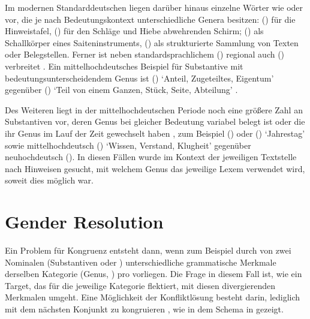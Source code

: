 Im modernen Standarddeutschen liegen darüber hinaus einzelne Wörter wie
 oder  vor, die je nach Bedeutungskontext
unterschiedliche Genera besitzen:  (\NeutI) für die
Hinweistafel,  (\MascI) für den Schläge und Hiebe abwehrenden
Schirm;  (\MascI) als Schallkörper eines Saiteninstruments,
 (\NeutI) als strukturierte Sammlung von Texten oder
Belegstellen. Ferner ist neben standardsprachlichem  (\FemI)
regional auch  (\MascI) verbreitet
\autocite[s.\,v.~\textit{der/die Butter}]{elspassmoeller2003}. Ein
mittelhochdeutsches Beispiel für Substantive mit
bedeutungs\-unterscheidendem Genus ist  (\MascI) `Anteil,
Zugeteiltes, Eigentum' gegenüber  (\NeutI) `Teil von einem
Ganzen, Stück, Seite, Abteilung' \autocite[s.\,v.~\textit{teil}]{lexer:mhdhwb}.

Des Weiteren liegt in der mittelhochdeutschen Periode
noch eine größere Zahl an Substantiven vor, deren Genus bei gleicher Bedeutung
variabel belegt ist oder die ihr Genus im Lauf der Zeit gewechselt haben
\autocite[157--166]{ksw2}, zum Beispiel  (\FemI) oder  (\NeutI) `Jahrestag' sowie mittel\-hoch\-deutsch
 (\FemI) `Wissen, Verstand, Klugheit'
\autocite[vgl.][s.\,v.~\textit{witze}]{lexer:mhdhwb} gegenüber
neu\-hoch\-deutsch  (\MascI). In diesen Fällen
wurde im Kontext der jeweiligen Text\-stelle nach Hinweisen gesucht, mit
welchem Genus das jeweilige Lexem verwendet wird, soweit dies möglich war.


\section{Gender Resolution}
\label{sec:gendres}

Ein Problem für Kongruenz entsteht dann, wenn zum Beispiel durch
 von zwei Nominalen (Substantiven oder
) unterschiedliche grammatische
Merkmale derselben Kategorie (Genus,
) pro  vorliegen. Die Frage in diesem Fall ist,
wie ein Target, das für die jeweilige Kategorie flektiert, mit diesen
divergierenden Merkmalen umgeht. Eine Möglichkeit der Konfliktlösung besteht
darin, lediglich mit dem nächsten Konjunkt zu kongruieren
\autocites[;
vgl.][179--180]{corbett1983}[168--170]{corbett2006}, wie in dem Schema in
 gezeigt.

